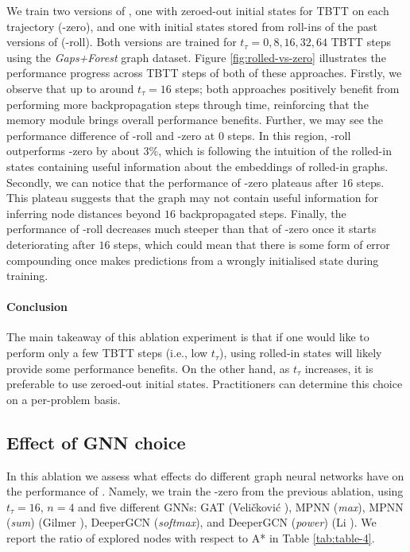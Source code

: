 We train two versions of \phil, one with zeroed-out initial states for TBTT on each trajectory (\phil-zero), and one with initial states stored from roll-ins of the past versions of \phil (\phil-roll). Both versions are trained for $t_\tau = 0, 8, 16, 32, 64$ TBTT steps using the \textit{Gaps+Forest} graph dataset. Figure \ref{fig:rolled-vs-zero} illustrates the performance progress across TBTT steps of both of these approaches. Firstly, we observe that up to around $t_\tau = 16$ steps; both approaches positively benefit from performing more backpropagation steps through time, reinforcing that the memory module brings overall performance benefits. Further, we may see the performance difference of \phil-roll and \phil-zero at $0$ steps. In this region, \phil-roll outperforms \phil-zero by about $3\%$, which is following the intuition of the rolled-in states containing useful information about the embeddings of rolled-in graphs. Secondly, we can notice that the performance of \phil-zero plateaus after $16$ steps. This plateau suggests that the graph may not contain useful information for inferring node distances beyond $16$ backpropagated steps. Finally, the performance of \phil-roll decreases much steeper than that of \phil-zero once it starts deteriorating after $16$ steps, which could mean that there is some form of error compounding once \phil makes predictions from a wrongly initialised state during training.

\paragraph{Conclusion} The main takeaway of this ablation experiment is that if one would like to perform only a few TBTT steps (i.e., low $t_\tau$), using rolled-in states will likely provide some performance benefits. On the other hand, as  $t_\tau$ increases, it is preferable to use zeroed-out initial states. Practitioners can determine this choice on a per-problem basis.


\subsection{Effect of GNN choice} 

In this ablation we assess what effects do different graph neural networks have on the performance of \phil. Namely, we train the \phil-zero from the previous ablation, using $t_\tau = 16$, $n=4$ and five different GNNs: GAT (Veličković \etal \cite{velivckovic2017graph}), MPNN (\textit{max}), MPNN (\textit{sum}) (Gilmer \etal \cite{gilmer2017neural}), DeeperGCN (\textit{softmax}), and DeeperGCN (\textit{power}) (Li \etal \cite{li2020deepergcn}). We report the ratio of explored nodes with respect to A* in Table \ref{tab:table-4}.

